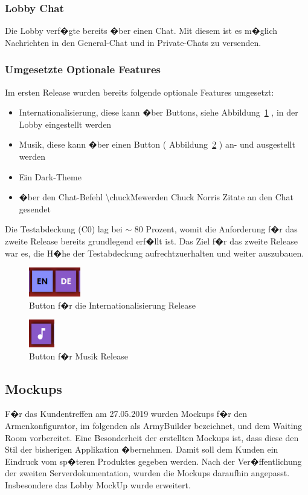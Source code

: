 \documentclass[12pt, titlepage]{scrartcl}
\newcommand{\RN}[1]{%
	\textup{\uppercase\expandafter{\romannumeral#1}}%
}
\newcommand{\Abb}[1]{%
	Abbildung\ \ref{#1}%
}
\begin{document}
	 	\subsubsection{Lobby Chat}
	 	Die Lobby verf�gte bereits �ber einen Chat. Mit diesem ist es m�glich Nachrichten in den General-Chat und in Private-Chats zu versenden.
	 	\subsubsection{Umgesetzte Optionale Features}
	 	Im ersten Release wurden bereits folgende optionale Features umgesetzt:
	 	\begin{itemize}
	 		\item Internationalisierung, diese kann �ber Buttons, siehe \Abb{Internationalisierung_Release_One}, in der Lobby eingestellt werden 
	 		\item Musik, diese kann �ber einen Button (\Abb{Musik_Release_One}) an- und ausgestellt werden 
	 		\item Ein Dark-Theme 
	 		\item �ber den Chat-Befehl \glqq \textbackslash chuckMe\grqq werden Chuck Norris Zitate an den Chat gesendet
	 	\end{itemize}
 		Die Testabdeckung (C0) lag bei $\sim$ 80 Prozent, womit die Anforderung f�r das zweite Release bereits grundlegend erf�llt ist. Das Ziel f�r das zweite Release war es, die H�he der Testabdeckung aufrechtzuerhalten und weiter auszubauen.
 		\begin{figure}[H] 
 			\centering
 			\includegraphics[width=0.2\textwidth]{Internationalisierung_Release_One.PNG}
 			\caption{Button f�r die Internationalisierung Release \RN{1}}
 			\label{Internationalisierung_Release_One}
 		\end{figure}
 		\begin{figure}[H] 
 			\centering
 			\includegraphics[width=0.1\textwidth]{Musik_Release_One.PNG}
 			\caption{Button f�r Musik Release \RN{1}}
 			\label{Musik_Release_One}
 		\end{figure}
 		
	\subsection{Mockups}
		F�r das Kundentreffen am 27.05.2019 wurden Mockups f�r den Armenkonfigurator, im folgenden als ArmyBuilder bezeichnet, und dem Waiting Room vorbereitet. Eine Besonderheit der erstellten Mockups ist, dass diese den Stil der bisherigen Applikation �bernehmen. Damit soll dem Kunden ein Eindruck vom sp�teren Produktes gegeben werden. Nach der Ver�ffentlichung der zweiten Serverdokumentation, wurden die Mockups daraufhin angepasst. Insbesondere das  Lobby MockUp wurde erweitert.
\end{document}
